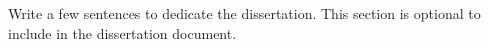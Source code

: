 Write a few sentences to dedicate the dissertation. This section is optional to include in the dissertation document.
\clearpage